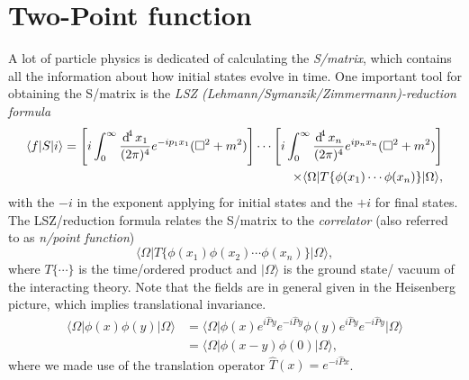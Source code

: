 \documentclass[../../index.tex]{subfiles}
\begin{document}
\section{Two-Point function}
\label{sec:twoPointFunction}
A lot of particle physics is dedicated of calculating the \textit{S\-/matrix},
which contains all the information about how initial states evolve in time. One
important tool for obtaining the S\-/matrix is the \textit{LSZ
  (Lehmann\-/Symanzik\-/Zimmermann)-reduction formula}
\cite{Lehmann1954a,Schwartz2013}
\begin{equation}
  \begin{split}
    \langle f\vert S \vert i\rangle = \left[ i\int_0^\infty \fdif{x_1}
      e^{-ip_1x_1} (\Box^2 + m^2)\right] \cdots
    \left[ i\int_0^\infty \fdif{x_n} e^{ip_nx_n} (\Box^2 + m^2)\right] \\
    \times \langle\Omega\vert T\{\phi(x_1)\cdots\phi(x_n)\} \vert\Omega\rangle,
  \end{split}
\end{equation}
with the $-i$ in the exponent applying for initial states and the $+i$ for final
states. The LSZ\-/reduction formula relates the S\-/matrix to the
\textit{correlator} (also referred to as \textit{n\-/point function})
\begin{equation}
  \langle\Omega\vert T\{\phi(x_1)\phi(x_2)\cdots\phi(x_n)\} \vert\Omega\rangle,
\end{equation}
where $T\{\cdots\}$ is the time\-/ordered product and $\vert\Omega\rangle$ is
the ground state/ vacuum of the interacting theory. Note that the fields are in
general given in the Heisenberg picture, which implies translational invariance.
\begin{equation}
  \begin{split}
    \langle\Omega\vert \phi(x)\phi(y) \vert\Omega\rangle &= \langle\Omega\vert \phi(x) e^{i\hat P y}e^{-i\hat P y}\phi(y)e^{i\hat P y}e^{-i\hat P y} \vert\Omega\rangle \\
    &= \langle\Omega\vert \phi(x-y)\phi(0) \vert\Omega\rangle,
  \end{split}
\end{equation}
where we made use of the translation operator $\hat T(x) = e^{-i \hat P x}$.
\end{document}
